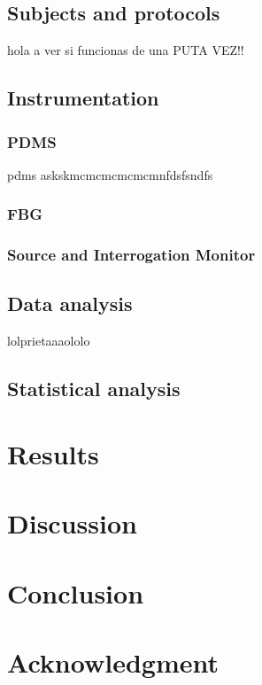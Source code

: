 \documentclass[conference]{IEEEtran}
\begin{document}
	\subsection{Subjects and protocols}
	hola a ver si funcionas de una PUTA VEZ!!
	
	\subsection{Instrumentation}
	\cite{dos}
	
	\subsubsection{PDMS}
	pdms askskmcmcmcmcmcmnfdsfsndfs
	
	
	\subsubsection{FBG}
	
	\subsubsection{Source and Interrogation Monitor}
	
	
	\subsection{Data analysis}
	lolprietaaaololo
	
	\subsection{Statistical analysis}
	
	
	
	
	\section{Results}
	
	
	
	\section{Discussion}
	
	
	
	
	\section{Conclusion}
	
	
	
	
	\section*{Acknowledgment}
	
	

	\printbibliography
	
		
	
\end{document}
